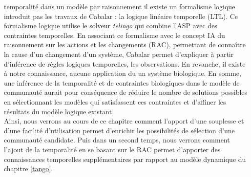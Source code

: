 \documentclass[../main.tex]{subfiles}
\begin{document}
temporalité dans un modèle par raisonnement il existe un formalisme logique introduit pas les travaux de Cabalar \citep{Cabalar2019} : la logique linéaire temporelle (LTL). Ce formalisme logique utilise le solveur \textit{telingo} qui combine l'ASP avec des contraintes temporelles. En associant ce formalisme avec le concept IA du raisonnement sur les actions et les changements (RAC), permettant de connaître la cause d'un changement d'un système, Cabalar permet d'expliquer à partir d'inférence de règles logiques temporelles, les observations. En revanche, il existe à notre connaissance, aucune application du un système biologique. En somme, une inférence de la temporalité et de contraintes biologiques dans le modèle de communauté aurait pour conséquence de réduire le nombre de solutions possibles en sélectionnant les modèles qui satisfassent ces contraintes et d'affiner les résultats du modèle logique existant. \\

Ainsi, nous verrons au cours de ce chapitre comment l'apport d'une souplesse et d'une facilité d'utilisation permet d'enrichir les possibilités de sélection d'une communauté candidate. Puis dans un second temps, nous verrons comment l'ajout de la temporalité en se basant sur le RAC permet d'apporter des connaissances temporelles supplémentaires par rapport au modèle dynamique du chapitre \ref{tango}. 
\end{document}
